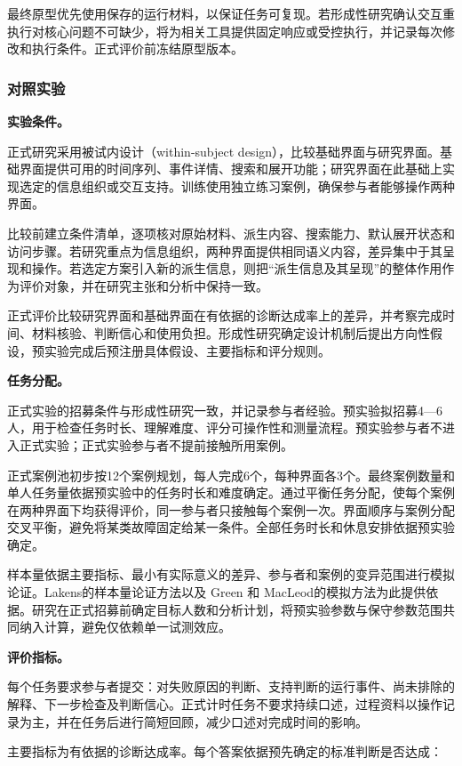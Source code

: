 最终原型优先使用保存的运行材料，以保证任务可复现。若形成性研究确认交互重执行对核心问题不可缺少，将为相关工具提供固定响应或受控执行，并记录每次修改和执行条件。正式评价前冻结原型版本。

\subsubsection{对照实验}

\noindent\textbf{实验条件。}

正式研究采用被试内设计（within-subject design），比较基础界面与研究界面。基础界面提供可用的时间序列、事件详情、搜索和展开功能；研究界面在此基础上实现选定的信息组织或交互支持。训练使用独立练习案例，确保参与者能够操作两种界面。

比较前建立条件清单，逐项核对原始材料、派生内容、搜索能力、默认展开状态和访问步骤。若研究重点为信息组织，两种界面提供相同语义内容，差异集中于其呈现和操作。若选定方案引入新的派生信息，则把“派生信息及其呈现”的整体作用作为评价对象，并在研究主张和分析中保持一致。

正式评价比较研究界面和基础界面在有依据的诊断达成率上的差异，并考察完成时间、材料核验、判断信心和使用负担。形成性研究确定设计机制后提出方向性假设，预实验完成后预注册具体假设、主要指标和评分规则。

\noindent\textbf{任务分配。}

正式实验的招募条件与形成性研究一致，并记录参与者经验。预实验拟招募4—6人，用于检查任务时长、理解难度、评分可操作性和测量流程。预实验参与者不进入正式实验；正式实验参与者不提前接触所用案例。

正式案例池初步按12个案例规划，每人完成6个，每种界面各3个。最终案例数量和单人任务量依据预实验中的任务时长和难度确定。通过平衡任务分配，使每个案例在两种界面下均获得评价，同一参与者只接触每个案例一次。界面顺序与案例分配交叉平衡，避免将某类故障固定给某一条件。全部任务时长和休息安排依据预实验确定。

样本量依据主要指标、最小有实际意义的差异、参与者和案例的变异范围进行模拟论证。Lakens\cite{ref67}的样本量论证方法以及 Green 和 MacLeod\cite{ref68}的模拟方法为此提供依据。研究在正式招募前确定目标人数和分析计划，将预实验参数与保守参数范围共同纳入计算，避免仅依赖单一试测效应。

\noindent\textbf{评价指标。}

每个任务要求参与者提交：对失败原因的判断、支持判断的运行事件、尚未排除的解释、下一步检查及判断信心。正式计时任务不要求持续口述，过程资料以操作记录为主，并在任务后进行简短回顾，减少口述对完成时间的影响。

主要指标为有依据的诊断达成率。每个答案依据预先确定的标准判断是否达成：

